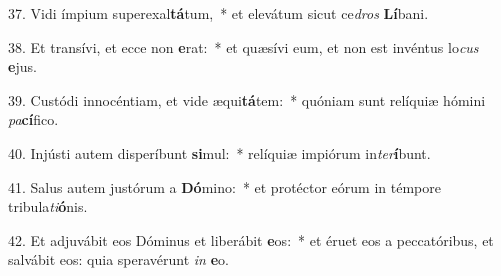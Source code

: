 37. Vidi ímpium superexal\textbf{tá}tum,~*  et elevátum sicut ce\textit{dros} \textbf{Lí}bani.\

38. Et transívi, et ecce non \textbf{e}rat:~*  et quæsívi eum, et non est invéntus lo\textit{cus} \textbf{e}jus.\

39. Custódi innocéntiam, et vide æqui\textbf{tá}tem:~*  quóniam sunt relíquiæ hómini \textit{pa}\textbf{cí}fico.\

40. Injústi autem disperíbunt \textbf{si}mul:~*  relíquiæ impiórum in\textit{ter}\textbf{í}bunt.\

41. Salus autem justórum a \textbf{Dó}mino:~*  et protéctor eórum in témpore tribula\textit{ti}\textbf{ó}nis.\

42. Et adjuvábit eos Dóminus et liberábit \textbf{e}os:~*  et éruet eos a peccatóribus, et salvábit eos: quia speravérunt \textit{in} \textbf{e}o.\

